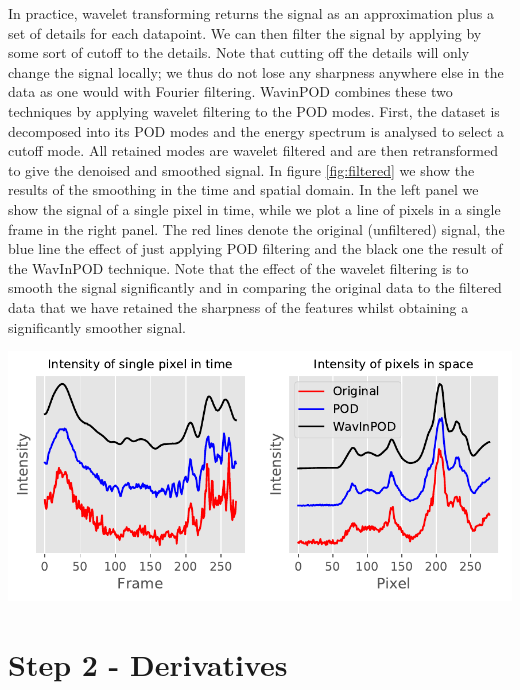 \documentclass{Dissertate}
\let\origfigure\figure
\let\endorigfigure\endfigure
\renewenvironment{figure}[1][2] {
    \expandafter\origfigure\expandafter[H]
} {
    \endorigfigure
}
\begin{document}
 In practice, wavelet transforming returns the signal as an approximation plus a set of details for each datapoint. We can then filter the signal by applying by some sort of cutoff to the details. Note that cutting off the details will only change the signal locally; we thus do not lose any sharpness anywhere else in the data as one would with Fourier filtering.
WavinPOD combines these two techniques by applying wavelet filtering to
the POD modes. First, the dataset is decomposed into its POD modes and the energy spectrum is analysed to select a cutoff mode. All retained
modes are wavelet filtered and are then retransformed to give the
denoised and smoothed signal. In figure \ref{fig:filtered} we show
the results of the smoothing in the time and spatial domain. In the left
panel we show the signal of a single pixel in time, while we plot a line
of pixels in a single frame in the right panel. The red lines denote the
original (unfiltered) signal, the blue line the effect of just applying
POD filtering and the black one the result of the WavInPOD technique. Note that the effect of the wavelet filtering is to smooth the signal
significantly and in comparing the original data to the filtered data
that we have retained the sharpness of the features whilst obtaining a significantly smoother signal.

\begin{figure}
\hypertarget{fig:filtered}{%
\centering
\includegraphics{source/figures/pdf/filtered.pdf}
\caption{Effect of POD with a cutoff of 27 and wavelet filtering with a
level 3 db4 wavelet. Left panel shows the result in the time domain,
right panel in the spatial domain. Lines have been offset for
clarity.}\label{fig:filtered}
}
\end{figure}

\hypertarget{step-2---derivatives}{%
\section{Step 2 - Derivatives}\label{step-2---derivatives}}
\end{document}
